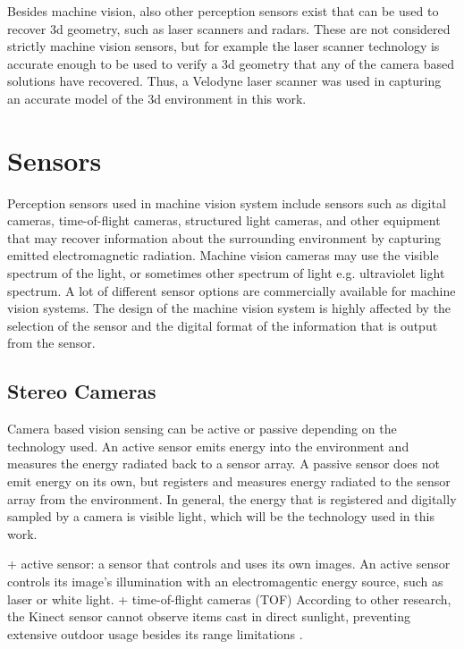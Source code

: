 \documentclass[12pt,a4paper,oneside,pdftex]{report}
\begin{document}
Besides machine vision, also other perception sensors exist that can be used to recover 3d geometry, such as laser scanners and radars. These are not considered strictly machine vision sensors, but for example the laser scanner technology is accurate enough to be used to verify a 3d geometry that any of the camera based solutions have recovered\citep{You11}. Thus, a Velodyne laser scanner was used in capturing an accurate model of the 3d environment in this work.

\section{Sensors}

Perception sensors used in machine vision system include sensors such as digital cameras, time-of-flight cameras, structured light cameras, and other equipment that may recover information about the surrounding environment by capturing emitted electromagnetic radiation. Machine vision cameras may use the visible spectrum of the light, or sometimes other spectrum of light e.g. ultraviolet light spectrum. A lot of different sensor options are commercially available for machine vision systems. The design of the machine vision system is highly affected by the selection of the sensor and the digital format of the information that is output from the sensor.

\subsection{Stereo Cameras}
\label{subsection:stereo_cameras}

Camera based vision sensing can be active or passive depending on the technology used. An active sensor emits energy into the environment and measures the energy radiated back to a sensor array. A passive sensor does not emit energy on its own, but registers and measures energy radiated to the sensor array from the environment. In general, the energy that is registered and digitally sampled by a camera is visible light, which will be the technology used in this work.



+ active sensor: a sensor that controls and uses its own images. An active sensor controls its image's illumination with an electromagentic energy source, such as laser or white light.
+ time-of-flight cameras (TOF)
According to other research, the Kinect sensor cannot observe items cast in direct sunlight, preventing extensive outdoor usage besides its range limitations \cite{tikkanen13}.  
\end{document}
